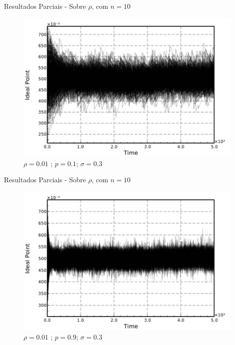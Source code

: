 \documentclass{beamer}
\begin{document}
\begin{frame}{Resultados Parciais - Sobre \(\rho\), com \(n = 10 \)}
  
  \begin{figure}[H]
    \centering
    \includegraphics[scale = 0.5]{ims/p01sigma03rho001.pdf}
    \caption{\(\rho = 0.01\)  ; \(p = 0.1\); \(\sigma = 0.3\) }
  \end{figure}
\end{frame}


\begin{frame}{Resultados Parciais - Sobre \(\rho\), com \(n = 10 \)}
  \begin{figure}[H]
    \centering
    \includegraphics[scale = 0.5]{ims/p09sigma03rho001.pdf}
    \caption{\(\rho = 0.01\)  ; \(p = 0.9\); \(\sigma = 0.3\) }
  \end{figure}
\end{frame}
\end{document}

